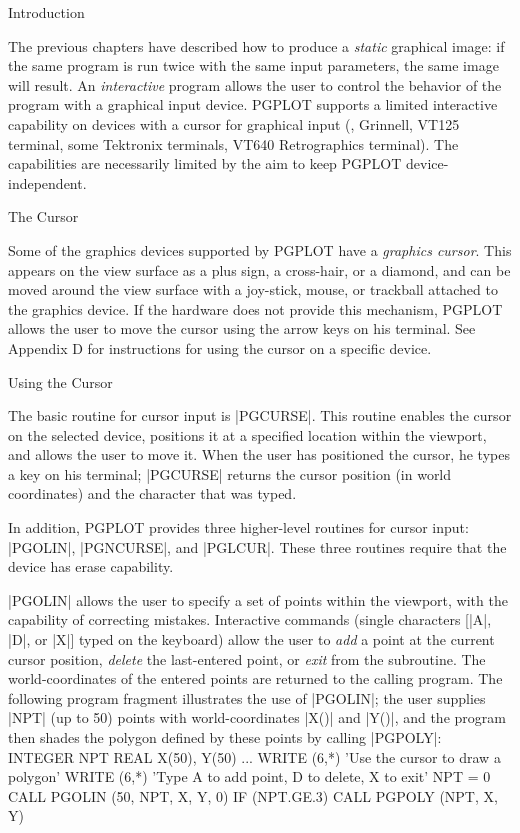 

\beginsection Introduction

The previous chapters have described how to produce a {\it static\/}
graphical image:  if the same program is run twice with the same input
parameters, the same image will result.  An {\it interactive\/}
program allows the user to control the behavior of the program with a
graphical input device. PGPLOT supports a limited interactive capability
on devices with a cursor for graphical input (\eg, Grinnell, VT125
terminal, some Tektronix terminals, VT640 Retrographics terminal).  The
capabilities are necessarily limited by the aim to keep PGPLOT
device-independent.

\beginsection The Cursor

Some of the graphics devices supported by PGPLOT have a {\it graphics
cursor}.  This appears on the view surface as a plus sign, a cross-hair,
or a diamond, and can be moved around the view surface with a joy-stick,
mouse, or trackball attached to the graphics device. If the hardware
does not provide this mechanism, PGPLOT allows the user to move the
cursor using the arrow keys on his terminal. See Appendix D for
instructions for using the cursor on a specific device. 

\beginsection Using the Cursor

The basic routine for cursor input is |PGCURSE|. This routine
enables the cursor on the selected device, positions it
at a specified location within the viewport, and allows the user to
move it.  When the user has positioned the cursor, he types a
key on his terminal; |PGCURSE| returns the cursor position (in world
coordinates) and the character that was typed. 

In addition, PGPLOT provides three higher-level routines for cursor 
input: |PGOLIN|, |PGNCURSE|, and |PGLCUR|.  These three routines
require that the device has erase capability.

|PGOLIN| allows the user to specify a set of points within the viewport,
with the capability of correcting mistakes. Interactive commands (single
characters [|A|, |D|, or |X|] typed on the keyboard) allow the user to {\it
add\/} a point at the current cursor position, {\it delete\/} the
last-entered point, or {\it exit\/} from the subroutine. The
world-coordinates of the entered points are returned to the calling
program. The following program fragment illustrates the use of |PGOLIN|;
the user supplies |NPT| (up to 50) points with world-coordinates |X()|
and |Y()|, and the program then shades the polygon defined by these
points by calling |PGPOLY|: 
\begintt
INTEGER NPT
REAL X(50), Y(50)
...
WRITE (6,*) 'Use the cursor to draw a polygon'
WRITE (6,*) 'Type A to add point, D to delete, X to exit'
NPT = 0
CALL PGOLIN (50, NPT, X, Y, 0)
IF (NPT.GE.3) CALL PGPOLY (NPT, X, Y)
\endtt

